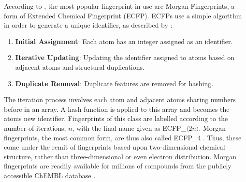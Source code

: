 According to \textcite{Cap20}, the most popular fingerprint in use are Morgan Fingerprints, a form of Extended Chemical Fingerprint (ECFP). ECFPs use a simple algorithm in order to generate a unique identifier, as described by \textcite{Mor2020}:

\begin{enumerate}
  \item \textbf{Initial Assignment}: Each atom has an integer assigned as an identifier.
  \item \textbf{Iterative Updating}: Updating the identifier assigned to atoms based on adjacent atoms and structural duplications.
  \item \textbf{Duplicate Removal}: Duplicate features are removed for hashing.
\end{enumerate}

The iteration process involves each atom and adjacent atoms sharing numbers before in an array. A hash function is applied to this array and becomes the atoms new identifier. Fingerprints of this class are labelled according to the number of iterations, $n$, with the final name given as ECFP\_$\langle{}2n\rangle{}$. Morgan fingerprints, the most common form, are thus also called ECFP\_4 \cite{Cap20, Mor2020}. Thus, these come under the remit of fingerprints based upon two-dimensional chemical structure, rather than three-dimensional or even electron distribution. Morgan fingerprints are readily available for millions of compounds from the publicly accessible ChEMBL database \cite{CHEMBL}.

